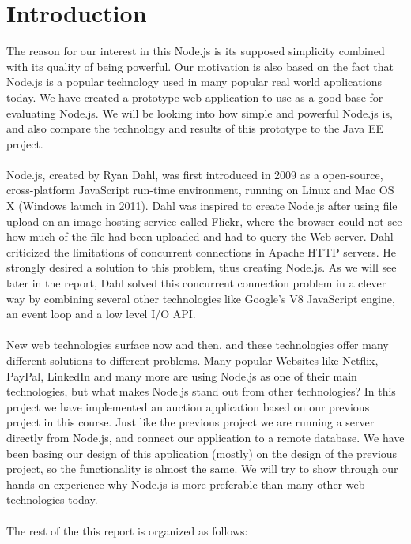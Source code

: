 \section{Introduction}
\label{sec:introduction}
 The reason for our interest in this Node.js is its supposed simplicity combined with its quality of being powerful. Our motivation is also based on the fact that Node.js is a popular technology used in many popular real world applications today. We have created a prototype web application to use as a good base for evaluating Node.js. We will be looking into how simple and powerful Node.js is, and also compare the technology and results of this prototype to the Java EE project.
\\\\
Node.js, created by Ryan Dahl, was first introduced in 2009 as a 
open-source, cross-platform JavaScript run-time environment, running on Linux and Mac OS X (Windows launch in 2011). Dahl was inspired to create Node.js after using file upload on an image hosting service called Flickr, where the browser could not see how much of the file had been uploaded and had to query the Web server. Dahl criticized the limitations of concurrent connections in Apache HTTP servers. He strongly desired a solution to this problem, thus creating Node.js. As we will see later in the report, Dahl solved this concurrent connection problem in a clever way by combining several other technologies like Google's V8 JavaScript engine, an event loop and a low level I/O API. \cite{wiki:nodejs}
\\\\
New web technologies surface now and then, and these technologies offer 
many different solutions to different problems. Many popular Websites like Netflix, PayPal, LinkedIn and many more are using Node.js as one of their main technologies, but what makes Node.js stand out from other technologies? In this project we have implemented an auction application based on our previous project in this course. Just like the previous project we are running a server directly from Node.js, and connect our application to a remote database. We have been basing our design of this application (mostly) on the design of the previous project, so the functionality is almost the same. We will try to show through our hands-on experience why Node.js is more preferable than many other web technologies today.
\\\\
The rest of the this report is organized as follows: 
